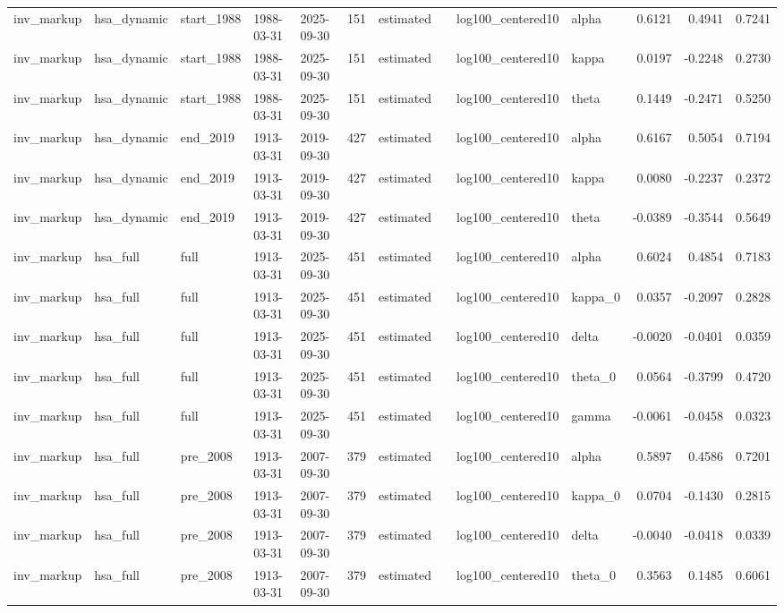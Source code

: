 \begin{tabular}{lllllrllllrrr}
inv\_markup & hsa\_dynamic & start\_1988 & 1988-03-31 & 2025-09-30 & 151 & estimated &  & log100\_centered10 & alpha & 0.6121 & 0.4941 & 0.7241 \\
inv\_markup & hsa\_dynamic & start\_1988 & 1988-03-31 & 2025-09-30 & 151 & estimated &  & log100\_centered10 & kappa & 0.0197 & -0.2248 & 0.2730 \\
inv\_markup & hsa\_dynamic & start\_1988 & 1988-03-31 & 2025-09-30 & 151 & estimated &  & log100\_centered10 & theta & 0.1449 & -0.2471 & 0.5250 \\
inv\_markup & hsa\_dynamic & end\_2019 & 1913-03-31 & 2019-09-30 & 427 & estimated &  & log100\_centered10 & alpha & 0.6167 & 0.5054 & 0.7194 \\
inv\_markup & hsa\_dynamic & end\_2019 & 1913-03-31 & 2019-09-30 & 427 & estimated &  & log100\_centered10 & kappa & 0.0080 & -0.2237 & 0.2372 \\
inv\_markup & hsa\_dynamic & end\_2019 & 1913-03-31 & 2019-09-30 & 427 & estimated &  & log100\_centered10 & theta & -0.0389 & -0.3544 & 0.5649 \\
inv\_markup & hsa\_full & full & 1913-03-31 & 2025-09-30 & 451 & estimated &  & log100\_centered10 & alpha & 0.6024 & 0.4854 & 0.7183 \\
inv\_markup & hsa\_full & full & 1913-03-31 & 2025-09-30 & 451 & estimated &  & log100\_centered10 & kappa\_0 & 0.0357 & -0.2097 & 0.2828 \\
inv\_markup & hsa\_full & full & 1913-03-31 & 2025-09-30 & 451 & estimated &  & log100\_centered10 & delta & -0.0020 & -0.0401 & 0.0359 \\
inv\_markup & hsa\_full & full & 1913-03-31 & 2025-09-30 & 451 & estimated &  & log100\_centered10 & theta\_0 & 0.0564 & -0.3799 & 0.4720 \\
inv\_markup & hsa\_full & full & 1913-03-31 & 2025-09-30 & 451 & estimated &  & log100\_centered10 & gamma & -0.0061 & -0.0458 & 0.0323 \\
inv\_markup & hsa\_full & pre\_2008 & 1913-03-31 & 2007-09-30 & 379 & estimated &  & log100\_centered10 & alpha & 0.5897 & 0.4586 & 0.7201 \\
inv\_markup & hsa\_full & pre\_2008 & 1913-03-31 & 2007-09-30 & 379 & estimated &  & log100\_centered10 & kappa\_0 & 0.0704 & -0.1430 & 0.2815 \\
inv\_markup & hsa\_full & pre\_2008 & 1913-03-31 & 2007-09-30 & 379 & estimated &  & log100\_centered10 & delta & -0.0040 & -0.0418 & 0.0339 \\
inv\_markup & hsa\_full & pre\_2008 & 1913-03-31 & 2007-09-30 & 379 & estimated &  & log100\_centered10 & theta\_0 & 0.3563 & 0.1485 & 0.6061 \\

\end{tabular}
